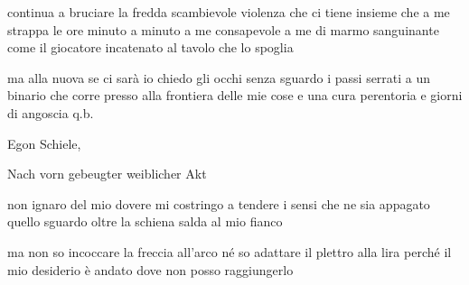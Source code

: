 \clearpage


\begin{poem}
	\begin{stanza}
		continua a bruciare\verseline
		la fredda scambievole violenza che ci tiene insieme\verseline
		che a me strappa le ore minuto a minuto\verseline
		a me consapevole\verseline
		a me di marmo sanguinante\verseline
		come il giocatore incatenato al tavolo che lo spoglia
	\end{stanza}

	\begin{stanza}
		ma alla nuova se ci sarà io chiedo\verseline
		gli occhi senza sguardo\verseline
		i passi serrati a un binario\verseline
		che corre presso alla frontiera delle mie cose\verseline
		e una cura perentoria\verseline
		e giorni di angoscia q.b.
	\end{stanza}
\end{poem}

\clearpage


\begin{artItem}
	Egon Schiele, \begin{otherlanguage}{german}%
		Nach vorn gebeugter weiblicher Akt%
	\end{otherlanguage}
\end{artItem}

\begin{poem}
	\begin{stanza}
		non ignaro del mio dovere\verseline
		mi costringo a tendere i sensi\verseline
		che ne sia appagato quello sguardo\verseline
		oltre la schiena salda al mio fianco
	\end{stanza}

	\begin{stanza}
		ma non so incoccare la freccia all'arco\verseline
		né so adattare il plettro alla lira\verseline
		perché il mio desiderio è andato\verseline
		dove non posso raggiungerlo
	\end{stanza}
\end{poem}

\clearpage


